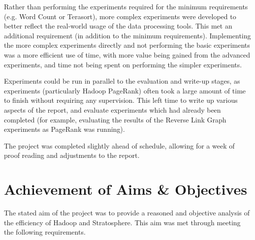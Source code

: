 Rather than performing the experiments required for the minimum requirements (e.g. Word Count or Terasort), more complex experiments were developed to better reflect the real-world usage of the data processing tools. This met an additional requirement (in addition to the minimum requirements). Implementing the more complex experiments directly and not performing the basic experiments was a more efficient use of time, with more value being gained from the advanced experiments, and time not being spent on performing the simpler experiments. 

Experiments could be run in parallel to the evaluation and write-up stages, as experiments (particularly Hadoop PageRank) often took a large amount of time to finish without requiring any supervision. This left time to write up various aspects of the report, and evaluate experiments which had already been completed (for example, evaluating the results of the Reverse Link Graph experiments as PageRank was running).

The project was completed slightly ahead of schedule, allowing for a week of proof reading and adjustments to the report.

\section{Achievement of Aims \& Objectives}
The stated aim of the project was to provide a reasoned and objective analysis of the efficiency of Hadoop and Stratosphere. This aim was met through meeting the following requirements.

